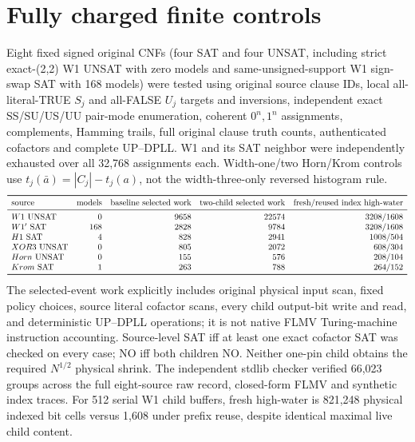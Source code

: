 \documentclass[10pt]{article}
\begin{document}
\section{Fully charged finite controls}
Eight fixed signed original CNFs (four SAT and four UNSAT, including strict exact-(2,2) W1 UNSAT with zero models and same-unsigned-support W1 sign-swap SAT with 168 models) were tested using original source clause IDs, local all-literal-TRUE $S_j$ and all-FALSE $U_j$ targets and inversions, independent exact SS/SU/US/UU pair-mode enumeration, coherent $0^n,1^n$ assignments, complements, Hamming trails, full original clause truth counts, authenticated cofactors and complete UP--DPLL. W1 and its SAT neighbor were independently exhausted over all 32,768 assignments each. Width-one/two Horn/Krom controls use $t_j(\bar a)=|C_j|-t_j(a)$, not the width-three-only reversed histogram rule.
\[
\begin{array}{lrrrr}
\toprule
\text{source}&\text{models}&\text{baseline selected work}&\text{two-child selected work}&
\text{fresh/reused index high-water}\\\midrule
W1\ \mathrm{UNSAT}&0&9658&22574&3208/1608\\
W1'\ \mathrm{SAT}&168&2828&9784&3208/1608\\
H1\ \mathrm{SAT}&4&828&2941&1008/504\\
XOR3\ \mathrm{UNSAT}&0&805&2072&608/304\\
Horn\ \mathrm{UNSAT}&0&155&576&208/104\\
Krom\ \mathrm{SAT}&1&263&788&264/152\\\bottomrule
\end{array}
\]
The selected-event work explicitly includes original physical input scan, fixed policy choices, source literal cofactor scans, every child output-bit write and read, and deterministic UP--DPLL operations; it is not native FLMV Turing-machine instruction accounting. Source-level SAT iff at least one exact cofactor SAT was checked on every case; NO iff both children NO. Neither one-pin child obtains the required $N^{1/2}$ physical shrink. The independent stdlib checker verified 66,023 groups across the full eight-source raw record, closed-form FLMV and synthetic index traces. For 512 serial W1 child buffers, fresh high-water is 821,248 physical indexed bit cells versus 1,608 under prefix reuse, despite identical maximal live child content.
\end{document}

